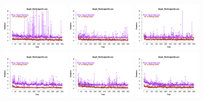 \begin{figure}[th]
\centering
\includegraphics[width=0.30\textwidth]{Figures/RTs_Exp2_P1} \includegraphics[width=0.30\textwidth]{Figures/RTs_Exp2_P2} \includegraphics[width=0.30\textwidth]{Figures/RTs_Exp2_P3}
\includegraphics[width=0.30\textwidth]{Figures/RTs_Exp2_P4} \includegraphics[width=0.30\textwidth]{Figures/RTs_Exp2_P5} \includegraphics[width=0.30\textwidth]{Figures/RTs_Exp2_P6}

\end{figure}
